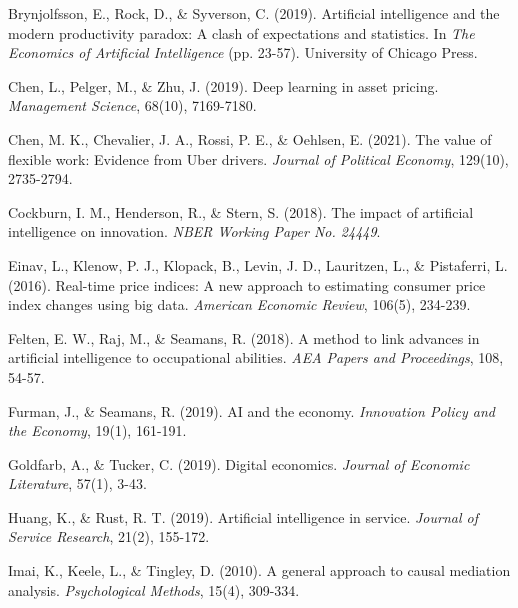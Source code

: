 \documentclass[12pt, a4paper]{article}
\begin{document}
\begin{thebibliography}{99}
Brynjolfsson, E., Rock, D., \& Syverson, C. (2019). Artificial intelligence and the modern productivity paradox: A clash of expectations and statistics. In \textit{The Economics of Artificial Intelligence} (pp. 23-57). University of Chicago Press.

Chen, L., Pelger, M., \& Zhu, J. (2019). Deep learning in asset pricing. \textit{Management Science}, 68(10), 7169-7180.

Chen, M. K., Chevalier, J. A., Rossi, P. E., \& Oehlsen, E. (2021). The value of flexible work: Evidence from Uber drivers. \textit{Journal of Political Economy}, 129(10), 2735-2794.

Cockburn, I. M., Henderson, R., \& Stern, S. (2018). The impact of artificial intelligence on innovation. \textit{NBER Working Paper No. 24449}.

Einav, L., Klenow, P. J., Klopack, B., Levin, J. D., Lauritzen, L., \& Pistaferri, L. (2016). Real-time price indices: A new approach to estimating consumer price index changes using big data. \textit{American Economic Review}, 106(5), 234-239.

Felten, E. W., Raj, M., \& Seamans, R. (2018). A method to link advances in artificial intelligence to occupational abilities. \textit{AEA Papers and Proceedings}, 108, 54-57.

Furman, J., \& Seamans, R. (2019). AI and the economy. \textit{Innovation Policy and the Economy}, 19(1), 161-191.

Goldfarb, A., \& Tucker, C. (2019). Digital economics. \textit{Journal of Economic Literature}, 57(1), 3-43.

Huang, K., \& Rust, R. T. (2019). Artificial intelligence in service. \textit{Journal of Service Research}, 21(2), 155-172.

Imai, K., Keele, L., \& Tingley, D. (2010). A general approach to causal mediation analysis. \textit{Psychological Methods}, 15(4), 309-334.


\end{thebibliography}
\end{document}
